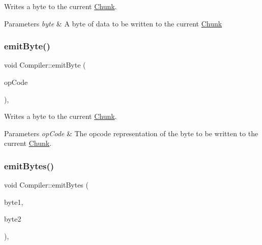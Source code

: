 Writes a byte to the current \hyperlink{class_chunk}{Chunk}. 


\begin{DoxyParams}{Parameters}
{\em byte} & A byte of data to be written to the current \hyperlink{class_chunk}{Chunk} \\
\hline
\end{DoxyParams}
\mbox{\label{class_compiler_ae6cb66fc6fd9d337517c0ea172aaea38}} 
\subsubsection{\texorpdfstring{emit\+Byte()}{emitByte()}\hspace{0.1cm}{\footnotesize\ttfamily [2/2]}}
{\footnotesize\ttfamily void Compiler\+::emit\+Byte (\begin{DoxyParamCaption}\item[{\hyperlink{_chunk_8h_a3d7c5cec8d9c1afc2c92ad39b9d64996}{Op\+Code}}]{op\+Code }\end{DoxyParamCaption})\hspace{0.3cm}{\ttfamily [inline]}, {\ttfamily [private]}}



Writes a byte to the current \hyperlink{class_chunk}{Chunk}. 


\begin{DoxyParams}{Parameters}
{\em op\+Code} & The opcode representation of the byte to be written to the current \hyperlink{class_chunk}{Chunk}. \\
\hline
\end{DoxyParams}
\mbox{\label{class_compiler_a815a75c9444d281252990947b2cd9792}} 
\subsubsection{\texorpdfstring{emit\+Bytes()}{emitBytes()}}
{\footnotesize\ttfamily void Compiler\+::emit\+Bytes (\begin{DoxyParamCaption}\item[{uint8\+\_\+t}]{byte1,  }\item[{uint8\+\_\+t}]{byte2 }\end{DoxyParamCaption})\hspace{0.3cm}{\ttfamily [inline]}, {\ttfamily [private]}}



